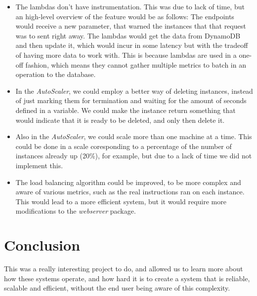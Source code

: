 \documentclass{article}
\begin{document}
\begin{itemize}
    \item The lambdas don't have instrumentation. This was due to lack of time,
        but an high-level overview of the feature would be as follows:
        \subitem The endpoints would receive a new parameter, that warned the
        instances that that request was to sent right away.
        \subitem The lambdas would get the data from DynamoDB and then update
        it, which would incur in some latency but with the tradeoff of having
        more data to work with. This is because lambdas are used in a one-off
        fashion, which means they cannot gather multiple metrics to batch in an
        operation to the database.
    \item In the \textit{AutoScaler}, we could employ a better way of deleting
        instances, instead of just marking them for termination and waiting for
        the amount of seconds defined in a variable. We could make the instance
        return something that would indicate that it is ready to be deleted, and
        only then delete it.
    \item Also in the \textit{AutoScaler}, we could scale more than one machine
        at a time. This could be done in a scale coresponding to a percentage of
        the number of instances already up (20\%), for example, but due to a
        lack of time we did not implement this.
    \item The load balancing algorithm could be improved, to be more complex and
        aware of various metrics, such as the real instructions ran on each
        instance. This would lead to a more efficient system, but it would
        require more modifications to the \textit{webserver} package.
\end{itemize}

\section{Conclusion}

This was a really interesting project to do, and allowed us to learn more about
how these systems operate, and how hard it is to create a system that is
reliable, scalable and efficient, without the end user being aware of this
complexity.
\end{document}
